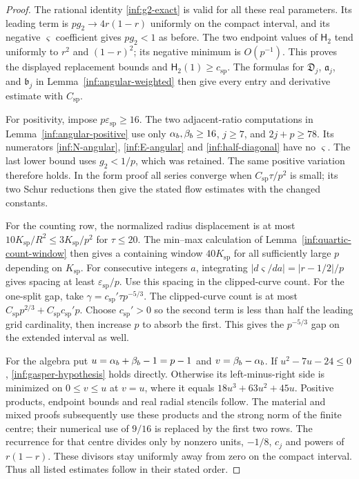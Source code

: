\begin{proof}
The rational identity \eqref{inf:g2-exact} is valid for all these real
parameters. Its leading term is $pg_2\to4r(1-r)$ uniformly on the
compact interval, and its negative $\varsigma$ coefficient gives
$pg_2<1$ as before. The two endpoint values of $\mathsf H_2$ tend
uniformly to $r^2$ and $(1-r)^2$; its negative minimum is
$O(p^{-1})$. This proves the displayed replacement bounds and
$\mathsf H_2(1)\ge c_{\mathrm{sp}}$. The formulas for
$\mathfrak D_j$, $\mathfrak a_j$, and $\mathfrak b_j$ in
Lemma~\ref{inf:angular-weighted} then give every entry and derivative
estimate with $C_{\mathrm{sp}}$.

For positivity, impose $p\varepsilon_{\mathrm{sp}}\ge16$. The two
adjacent-ratio computations in Lemma~\ref{inf:angular-positive} use
only $\alpha_b,\beta_b\ge16$, $j\ge7$, and $2j+p\ge78$.
Its numerators \eqref{inf:N-angular}, \eqref{inf:E-angular} and
\eqref{inf:half-diagonal} have no $\varsigma$. The last lower bound
uses $g_2<1/p$, which was retained. The same positive variation
therefore holds. In the form proof all series converge when
$C_{\mathrm{sp}}\tau/p^2$ is small; its two Schur reductions then
give the stated flow estimates with the changed constants.

For the counting row, the normalized radius displacement is at most
$10K_{\mathrm{sp}}/R^2\le3K_{\mathrm{sp}}/p^2$ for $\tau\le20$.
The min--max calculation of Lemma~\ref{inf:quartic-count-window}
then gives a containing window $40K_{\mathrm{sp}}$ for all sufficiently
large $p$ depending on $K_{\mathrm{sp}}$. For consecutive integers $a$,
integrating $|d\varsigma/da|=|r-1/2|/p$ gives spacing at least
$\varepsilon_{\mathrm{sp}}/p$. Use this spacing in the clipped-curve count.
For the one-split gap, take $\gamma=c_{\mathrm{sp}}'\tau p^{-5/3}$.
The clipped-curve count is at most
$C_{\mathrm{sp}}p^{2/3}+C_{\mathrm{sp}}c_{\mathrm{sp}}'p$.
Choose $c_{\mathrm{sp}}'>0$ so the second term is less than half
the leading grid cardinality, then increase $p$ to absorb the first.
This gives the $p^{-5/3}$ gap on the extended interval as well.

For the algebra put $u=\alpha_b+\beta_b-1=p-1$ and $v=\beta_b-\alpha_b$.
If $u^2-7u-24\le0$, \eqref{inf:gasper-hypothesis} holds directly.
Otherwise its left-minus-right side is minimized on $0\le v\le u$
at $v=u$, where it equals $18u^3+63u^2+45u$.
Positive products, endpoint bounds and real radial stencils follow.
The material and mixed proofs subsequently use these products and
the strong norm of the finite centre; their numerical use of $9/16$
is replaced by the first two rows. The recurrence for that centre
divides only by nonzero units, $-1/8$, $c_j$ and powers of $r(1-r)$.
These divisors stay uniformly away from zero on the compact interval.
Thus all listed estimates follow in their stated order.
\end{proof}

